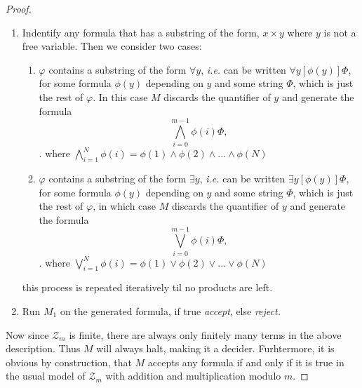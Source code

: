 \documentclass[a4paper,11pt]{article}
\newcommand{\ie}{\emph{i.e.} }
\numberwithin{equation}{section}
\begin{document}
\begin{proof}
\begin{enumerate}
		\item Indentify any formula that has a substring of the form, $ x\times y $ where $ y $ is not a free variable. Then we consider two cases:\begin{enumerate}
			\item $\varphi $ contains a substring of the form $ \forall y $, \ie can be written $ \forall y[\phi(y)]\Phi $, for some formula $ \phi(y) $ depending on $ y $ and some string $ \Phi $, which is just the rest of $ \varphi $. In this case $ M $ discards the quantifier of $ y $ and generate the formula \begin{equation}
			\bigwedge_{i=0}^{m-1}\phi(i)\Phi,
			\end{equation}.
			where $ \bigwedge_{i=1}^N \phi(i)=\phi(1)\wedge\phi(2)\wedge...\wedge\phi(N) $
			\item $\varphi $ contains a substring of the form $ \exists y $, \ie can be written $ \exists y[\phi(y)]\Phi $, for some formula $ \phi(y) $ depending on $ y $ and some string $ \Phi $, which is just the rest of $ \varphi $, in which case $ M $ discards the quantifier of $ y $ and generate the formula \begin{equation}
			\bigvee_{i=0}^{m-1}\phi(i)\Phi,
			\end{equation}.
			where $ \bigvee_{i=1}^N \phi(i)=\phi(1)\vee\phi(2)\vee...\vee\phi(N) $
		\end{enumerate}
		this process is repeated iteratively til no products are left.
		\item Run $ M_1 $ on the generated formula, if true \emph{accept}, else \emph{reject.}
	\end{enumerate}
	Now since $ \mathcal{Z}_m $ is finite, there are always only finitely many terms in the above description. Thus $ M $ will always halt, making it a decider. Furhtermore, it is obvious by construction, that $ M $ accepts any formula if and only if it is true in the usual model of $ \mathcal{Z}_m $ with addition and multiplication modulo $ m $.
\end{proof}
\end{document}
